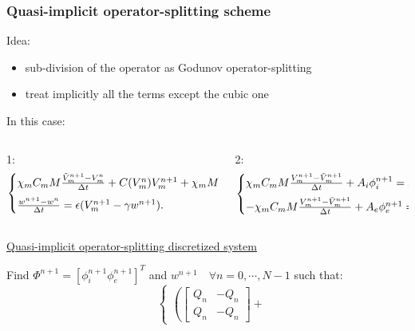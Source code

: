 \documentclass[9pt]{beamer}
\begin{document}
\begin{frame}
\frametitle{Quasi-implicit operator-splitting scheme}
Idea:
\begin{itemize}
\item sub-division of the operator as Godunov operator-splitting
\item treat implicitly all the terms except the cubic one
\end{itemize}
\vspace{2mm}
In this case:
\begin{columns}
            \begin{column}{0.5\textwidth}
\small 1:
 \begin{equation*}
\begin{cases}
\chi_m C_m M \frac{\tilde{V}_m^{n+1}-V_m^n}{\Delta t} +  C(V_m^n) V_m^{n+1} + \chi_m M w^{n+1}= 0,\vspace{2mm}\\
\frac{w^{n+1} - w^n}{\Delta t} = \epsilon (V_m^{n+1}-\gamma w^{n+1}).
\end{cases}
\end{equation*}
            \end{column}
            \hspace{1cm}
            \begin{column}{0.5\textwidth}  
            \small 2:
\begin{equation*}
\begin{cases}
\chi_m C_m M \frac{V_m^{n+1}-\tilde{V}_m^{n+1}}{\Delta t} + A_i \phi_i^{n+1}= F_i^{n+1},\vspace{2mm}\\
- \chi_m C_m M \frac{V_m^{n+1}-\tilde{V}_m^{n+1}}{\Delta t} + A_e \phi_e^{n+1}= F_e^{n+1}.
\end{cases}
\end{equation*}
            \end{column}
     \end{columns}
\vspace{3mm}
\begin{center}
\underline{Quasi-implicit operator-splitting discretized system}
\end{center}
Find $\Phi^{n+1}=[\phi_i^{n+1} \phi_e^{n+1}]^T$ and $w^{n+1} \quad \forall n=0, \cdots, N-1$ such that:
\begin{equation*}
\quad
\begin{cases}
\left(
\begin{bmatrix} Q_n & -Q_n \\ Q_n & -Q_n \end{bmatrix} + 

\end{cases}
\end{equation*}
\end{frame}
\end{document}
